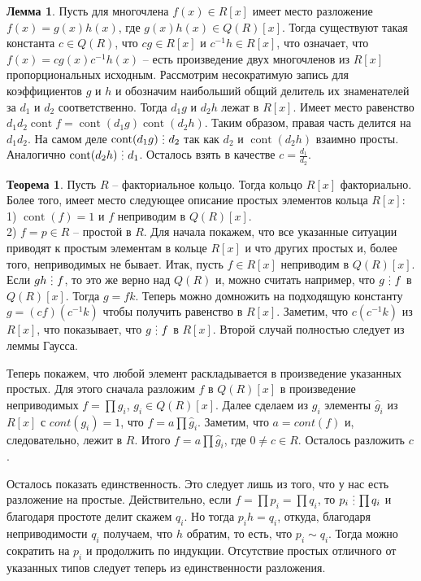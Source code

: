 \documentclass[10pt,a4paper,oneside]{book}
\theoremstyle{definition}
\newtheorem{thm}{{\color{red!40!black} Теорема}}
\newtheorem{lem}{{\color{green!50!black} Лемма}}
\newcommand{\cnt}{\operatorname{cont}}
\newcommand{\di}{\mathop{\,\scalebox{0.85}{\raisebox{-1.2pt}[0.5\height]{\vdots}}\,}}
\def\thrm{\begin{thm}}
\def\ethrm{\end{thm}}
\def\lm{\begin{lem}}
\def\elm{\end{lem}}
\begin{document}
\lm Пусть для многочлена $f(x) \in R[x]$  имеет место разложение $f(x)=g(x)h(x)$, где  $g(x)h(x) \in Q(R)[x]$. Тогда существуют такая константа $c \in Q(R)$, что $cg \in R[x]$ и $c^{-1}h \in R[x]$, что означает, что $f(x)=cg(x)c^{-1}h(x)$ -- есть произведение двух многочленов из $R[x]$ пропорциональных исходным.
\proof
Рассмотрим несократимую запись для коэффициентов $g$ и $h$ и обозначим наибольший общий делитель их знаменателей за $d_1$ и $d_2$ соответственно. Тогда $d_1g$ и $d_2h$ лежат в $R[x]$. Имеет место равенство $d_1 d_2\cnt f = \cnt(d_1 g) \cnt(d_2h)$. Таким образом, правая часть делится на $d_1d_2$. На самом деле $\cnt(d_1 g) \di d_2$ так как $d_2$ и $\cnt(d_2h)$ взаимно просты. Аналогично $\cnt(d_2h) \di d_1$. Осталось взять в качестве $c= \frac{d_1}{d_2}$.

\endproof
\elm


\thrm Пусть $R$ -- факториальное кольцо. Тогда кольцо $R[x]$ факториально. Более того, имеет место следующее описание простых элементов кольца $R[x]$:\\
1)  $\cnt(f)=1$ и $f$ неприводим в $Q(R)[x]$.\\
2) $f=p \in R$ -- простой в $R$.
\proof 
Для начала покажем, что все указанные ситуации приводят к простым элементам в кольце $R[x]$ и что других простых и, более того, неприводимых не бывает.
Итак, пусть $f \in R[x]$ неприводим в $Q(R)[x]$. Если $gh\di f$, то это же верно над $Q(R)$ и, можно считать например, что $g\di f$ в $Q(R)[x]$. Тогда $g= fk$. Теперь можно домножить на подходящую константу $g= (cf) (c^{-1}k)$ чтобы получить равенство в $R[x]$. Заметим, что $c(c^{-1}k)$ из $R[x]$, что показывает, что $g \di f$ в $R[x]$. Второй случай полностью следует из леммы Гаусса.


Теперь покажем, что любой элемент раскладывается в произведение указанных простых. Для этого сначала разложим $f$ в $Q(R)[x]$ в произведение неприводимых $f=\prod g_i$, $g_i \in Q(R)[x]$. Далее сделаем из $g_i$ элементы $\hat{g}_i$ из $R[x]$ с $cont(g_i)=1$, что $f=a\prod \hat{g}_i$. Заметим, что $a=cont(f)$ и, следовательно, лежит в $R$. Итого $f=a\prod \hat{g}_i$, где $ 0 \neq c \in R$. Осталось разложить $c$.

Осталось показать единственность. Это следует лишь из того, что у нас есть разложение на простые. Действительно, если $f=\prod p_i=\prod q_i$, то $p_i \di \prod q_i$ и благодаря простоте делит скажем $q_i$. Но тогда $p_ih=q_i$, откуда, благодаря неприводимости $q_i$ получаем, что $h$ обратим, то есть, что $p_i \sim q_i$. Тогда можно сократить на $p_i$ и продолжить по индукции. Отсутствие простых отличного от указанных типов следует теперь из единственности разложения.
\endproof
\ethrm
\end{document}
